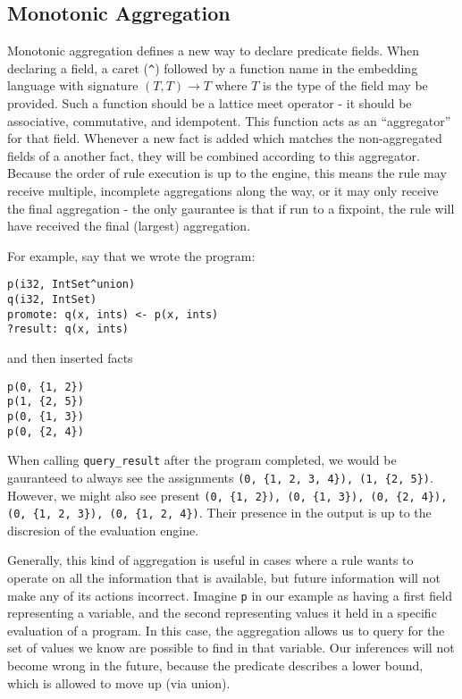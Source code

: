 \subsection{Monotonic Aggregation}
Monotonic aggregation defines a new way to declare predicate fields.
When declaring a field, a caret (\texttt{\^{}}) followed by a function name in the embedding language with signature $(T, T) \rightarrow T$ where $T$ is the type of the field may be provided.
Such a function should be a lattice meet operator - it should be associative, commutative, and idempotent.
This function acts as an ``aggregator'' for that field.
Whenever a new fact is added which matches the non-aggregated fields of a another fact, they will be combined according to this aggregator.
Because the order of rule execution is up to the engine, this means the rule may receive multiple, incomplete aggregations along the way, or it may only receive the final aggregation - the only gaurantee is that if run to a fixpoint, the rule will have received the final (largest) aggregation.

For example, say that we wrote the program:
\begin{verbatim}
p(i32, IntSet^union)
q(i32, IntSet)
promote: q(x, ints) <- p(x, ints)
?result: q(x, ints)
\end{verbatim}
and then inserted facts
\begin{verbatim}
p(0, {1, 2})
p(1, {2, 5})
p(0, {1, 3})
p(0, {2, 4})
\end{verbatim}

When calling \texttt{query\_result} after the program completed, we would be gauranteed to always see the assignments \texttt{(0, \{1, 2, 3, 4\}), (1, \{2, 5\})}.
However, we might also see present \texttt{(0, \{1, 2\}), (0, \{1, 3\}), (0, \{2, 4\}), (0, \{1, 2, 3\}), (0, \{1, 2, 4\})}.
Their presence in the output is up to the discresion of the evaluation engine.

Generally, this kind of aggregation is useful in cases where a rule wants to operate on all the information that is available, but future information will not make any of its actions incorrect.
Imagine \texttt{p} in our example as having a first field representing a variable, and the second representing values it held in a specific evaluation of a program.
In this case, the aggregation allows us to query for the set of values we know are possible to find in that variable.
Our inferences will not become wrong in the future, because the predicate describes a lower bound, which is allowed to move up (via union).
